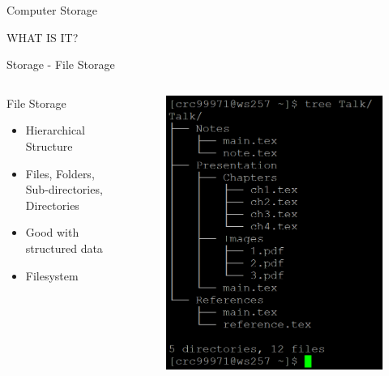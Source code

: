 \begin{frame}{Computer Storage}
\begin{center}
    \Huge WHAT IS IT?
\end{center}{}
\end{frame}



\begin{frame}{Storage - File Storage}
\begin{columns}
    \begin{column}{0.47\textwidth}
    \begin{block}{File Storage}
        \begin{itemize}
            \item Hierarchical Structure 
            \item Files, Folders, Sub-directories, Directories
            \item Good with structured data 
            \item Filesystem
        \end{itemize}
    \end{block}
    \end{column}
    \begin{column}{0.47\textwidth}
        \begin{figure}
        \centering
        \includegraphics[width=\textwidth,height=0.7\textheight,keepaspectratio]{img/tree.PNG}

\end{figure}
\end{column}
\end{columns}
\end{frame}
